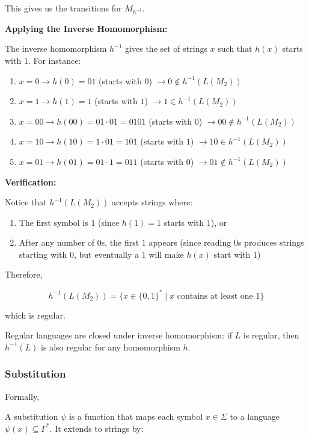 \documentclass[12pt,a4paper,openany]{article}
\begin{document}
This gives us the transitions for $M_{h^{-1}}$.

\textbf{Applying the Inverse Homomorphism:}

The inverse homomorphism $h^{-1}$ gives the set of strings $x$ such that $h(x)$ starts with $1$. For instance:

\begin{enumerate}
    \item $x = 0 \to h(0) = 01$ (starts with $0$) $\to 0 \notin h^{-1}(L(M_2))$
    \item $x = 1 \to h(1) = 1$ (starts with $1$) $\to 1 \in h^{-1}(L(M_2))$
    \item $x = 00 \to h(00) = 01 \cdot 01 = 0101$ (starts with $0$) $\to 00 \notin h^{-1}(L(M_2))$
    \item $x = 10 \to h(10) = 1 \cdot 01 = 101$ (starts with $1$) $\to 10 \in h^{-1}(L(M_2))$
    \item $x = 01 \to h(01) = 01 \cdot 1 = 011$ (starts with $0$) $\to 01 \notin h^{-1}(L(M_2))$
\end{enumerate}

\textbf{Verification:}

Notice that $h^{-1}(L(M_2))$ accepts strings where:

\begin{enumerate}
    \item The first symbol is $1$ (since $h(1) = 1$ starts with $1$), or
    \item After any number of $0$s, the first $1$ appears (since reading $0$s produces strings starting with $0$, but eventually a $1$ will make $h(x)$ start with $1$)
\end{enumerate}

Therefore,

\[ h^{-1}(L(M_2)) = \{x \in \{0,1\}^* \mid x \text{ contains at least one } 1\} \]

which is regular.

Regular languages are closed under inverse homomorphism: if $L$ is regular, then $h^{-1}(L)$ is also regular for any homomorphism $h$.

\subsubsection{Substitution}

Formally,

A substitution $\psi$ is a function that maps each symbol $x \in \Sigma$ to a language $\psi(x) \subseteq \Gamma^*$. It extends to strings by:
\end{document}
